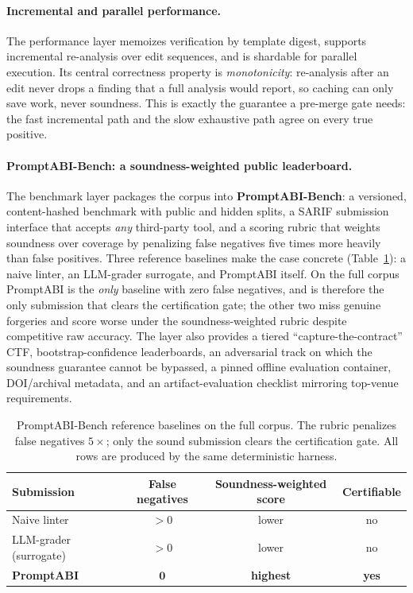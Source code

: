 \documentclass[10pt]{article}
\begin{document}
\paragraph{Incremental and parallel performance.}
The performance layer memoizes verification by template digest, supports
incremental re-analysis over edit sequences, and is shardable for parallel
execution. Its central correctness property is \emph{monotonicity}: re-analysis
after an edit never drops a finding that a full analysis would report, so caching
can only save work, never soundness. This is exactly the guarantee a pre-merge
gate needs: the fast incremental path and the slow exhaustive path agree on every
true positive.

\paragraph{PromptABI-Bench: a soundness-weighted public leaderboard.}
The benchmark layer packages the corpus into \textbf{PromptABI-Bench}: a
versioned, content-hashed benchmark with public and hidden splits, a SARIF
submission interface that accepts \emph{any} third-party tool, and a scoring
rubric that weights soundness over coverage by penalizing false negatives five
times more heavily than false positives. Three reference baselines make the case
concrete (Table~\ref{tab:bench-baselines}): a naive linter, an LLM-grader
surrogate, and PromptABI itself. On the full corpus PromptABI is the \emph{only}
baseline with zero false negatives, and is therefore the only submission that
clears the certification gate; the other two miss genuine forgeries and score
worse under the soundness-weighted rubric despite competitive raw accuracy. The
layer also provides a tiered ``capture-the-contract'' CTF, bootstrap-confidence
leaderboards, an adversarial track on which the soundness guarantee cannot be
bypassed, a pinned offline evaluation container, DOI/archival metadata, and an
artifact-evaluation checklist mirroring top-venue requirements.

\begin{table}[t]
\centering
\small
\begin{tabular}{lccc}
\toprule
Submission & False negatives & Soundness-weighted score & Certifiable \\
\midrule
Naive linter & $>0$ & lower & no \\
LLM-grader (surrogate) & $>0$ & lower & no \\
\textbf{PromptABI} & $\mathbf{0}$ & \textbf{highest} & \textbf{yes} \\
\bottomrule
\end{tabular}
\caption{PromptABI-Bench reference baselines on the full corpus. The rubric
penalizes false negatives $5\times$; only the sound submission clears the
certification gate. All rows are produced by the same deterministic harness.}
\label{tab:bench-baselines}
\end{table}
\end{document}
